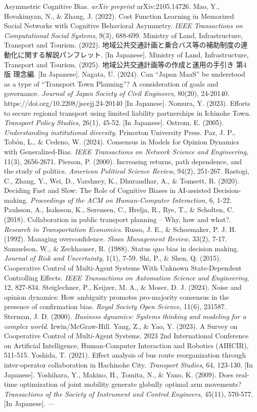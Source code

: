 Asymmetric Cognitive Bias. \emph{arXiv preprint} arXiv:2105.14726. Mao,
Y., Hovakimyan, N., \& Zhang, J. (2022). Cost Function Learning in
Memorized Social Networks with Cognitive Behavioral Asymmetry.
\emph{IEEE Transactions on Computational Social Systems}, 9(3), 688-699.
Ministry of Land, Infrastructure, Transport and Tourism. (2022).
地域公共交通計画と乗合バス等の補助制度の連動化に関する解説パンフレット.
{[}In Japanese{]}. Ministry of Land, Infrastructure, Transport and
Tourism. (2025). 地域公共交通計画等の作成と運用の手引き 第4版 理念編.
{[}In Japanese{]}. Nagata, U. (2024). Can ``Japan MaaS'' be understood
as a type of ``Transport Town Planning''? A consideration of goals and
governance. \emph{Journal of Japan Society of Civil Engineers}, 80(20),
24-20140. https://doi.org/10.2208/jscejj.24-20140 {[}In Japanese{]}.
Nomura, Y. (2023). Efforts to secure regional transport using limited
liability partnerships in Ichinohe Town. \emph{Transport Policy
Studies}, 26(1), 45-52. {[}In Japanese{]}. Ostrom, E. (2005).
\emph{Understanding institutional diversity}. Princeton University
Press. Paz, J. P., Tobón, L., \& Cedeno, W. (2024). Consensus in Models
for Opinion Dynamics with Generalized-Bias. \emph{IEEE Transactions on
Network Science and Engineering}, 11(3), 2656-2671. Pierson, P. (2000).
Increasing returns, path dependence, and the study of politics.
\emph{American Political Science Review}, 94(2), 251-267. Rastogi, C.,
Zhang, Y., Wei, D., Varshney, K., Dhurandhar, A., \& Tomsett, R. (2020).
Deciding Fast and Slow: The Role of Cognitive Biases in AI-assisted
Decision-making. \emph{Proceedings of the ACM on Human-Computer
Interaction}, 6, 1-22. Paulsson, A., Isaksson, K., Sørensen, C., Hrelja,
R., Rye, T., \& Scholten, C. (2018). Collaboration in public transport
planning -- Why, how and what?. \emph{Research in Transportation
Economics}. Russo, J. E., \& Schoemaker, P. J. H. (1992). Managing
overconfidence. \emph{Sloan Management Review}, 33(2), 7-17. Samuelson,
W., \& Zeckhauser, R. (1988). Status quo bias in decision making.
\emph{Journal of Risk and Uncertainty}, 1(1), 7-59. Shi, P., \& Shen, Q.
(2015). Cooperative Control of Multi-Agent Systems With Unknown
State-Dependent Controlling Effects. \emph{IEEE Transactions on
Automation Science and Engineering}, 12, 827-834. Steiglechner, P.,
Keijzer, M. A., \& Moser, D. J. (2024). Noise and opinion dynamics: How
ambiguity promotes pro-majority consensus in the presence of
confirmation bias. \emph{Royal Society Open Science}, 11(6), 231587.
Sterman, J. D. (2000). \emph{Business dynamics: Systems thinking and
modeling for a complex world}. Irwin/McGraw-Hill. Yang, Z., \& Yao, Y.
(2023). A Survey on Cooperative Control of Multi-Agent Systems. 2023 2nd
International Conference on Artificial Intelligence, Human-Computer
Interaction and Robotics (AIHCIR), 511-515. Yoshida, T. (2021). Effect
analysis of bus route reorganization through inter-operator
collaboration in Hachinohe City. \emph{Transport Studies}, 64, 123-130.
{[}In Japanese{]}. Yoshihara, Y., Makino, H., Tomita, N., \& Yano, K.
(2009). Does real-time optimization of joint mobility generate globally
optimal arm movements? \emph{Transactions of the Society of Instrument
and Control Engineers}, 45(11), 570-577. {[}In Japanese{]}. ---

